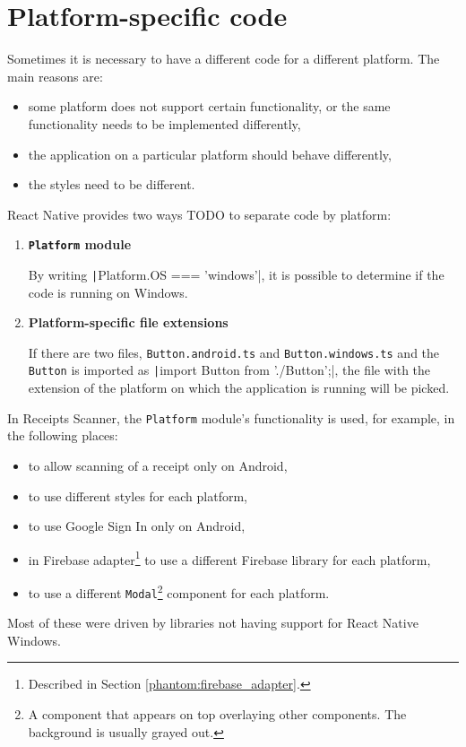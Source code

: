 \documentclass[
  digital, %
  table,   %
  oneside, %
  lof,     %
  lot,     %
]{fithesis3}
\newcommand{\code}[1]{\texttt|#1|} %
\begin{document}
\section{Platform-specific code}
\label{sec:platform_specific_code}
Sometimes it is necessary to have a different code for a different platform. The main reasons are:
\begin{itemize}
\item some platform does not support certain functionality, or the same functionality needs to be implemented differently,
\item the application on a particular platform should behave differently,
\item the styles need to be different.
\end{itemize}

React Native provides two ways TODO to separate code by platform:
\begin{enumerate}
\item \textbf{\texttt{Platform} module}
    
    By writing \code{Platform.OS === 'windows'}, it is possible to determine if the code is running on Windows.
\item \textbf{Platform-specific file extensions}

    If there are two files, \texttt{Button.android.ts} and \texttt{Button.windows.ts} and the \texttt{Button} is imported as \code{import Button from './Button';}‚ the file with the extension of the platform on which the application is running will be picked.
\end{enumerate}

In Receipts Scanner, the \texttt{Platform} module's functionality is used, for example, in the following places:
\begin{itemize}
    \item to allow scanning of a receipt only on Android,
    \item to use different styles for each platform,
    \item to use Google Sign In only on Android,
    \item in Firebase adapter\footnote{Described in Section \ref{phantom:firebase_adapter}.} to use a different Firebase library for each platform,
    \item to use a different \texttt{Modal}\footnote{A component that appears on top overlaying other components. The background is usually grayed out.} component for each platform.
\end{itemize}
Most of these were driven by libraries not having support for React Native Windows.
\end{document}
